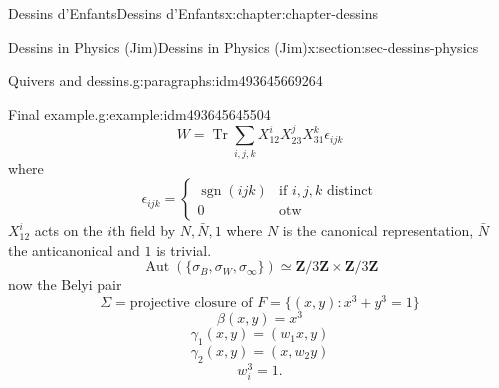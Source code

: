 \documentclass[oneside,10pt,]{book}
\numberwithin{equation}{section}
\newcommand{\ZZ}{\mathbf{Z}}
\DeclareMathOperator{\sgn}{sgn}
\DeclareMathOperator{\trace}{Tr}
\DeclareMathOperator{\Aut}{Aut}
\newcommand{\amp}{&}
\begin{document}
\begin{chapterptx}{Dessins d'Enfants}{}{Dessins d'Enfants}{}{}{x:chapter:chapter-dessins}
\begin{sectionptx}{Dessins in Physics (Jim)}{}{Dessins in Physics (Jim)}{}{}{x:section:sec-dessins-physics}
\begin{paragraphs}{Quivers and dessins.}{g:paragraphs:idm493645669264}
\begin{example}{Final example.}{g:example:idm493645645504}
\begin{equation*}
W = \trace \sum_{i,j,k} X_{12}^iX_{23}^j X_{31}^k \epsilon_{ijk}
\end{equation*}
where%
\begin{equation*}
\epsilon_{ijk} = \begin{cases} \sgn(ijk) \amp\text{if }i,j,k \text{ distinct}\\ 0 \amp\text{otw}\end{cases}
\end{equation*}
\(X_{12}^i\) acts on the \(i\)th field by \(N, \bar N, 1\) where \(N\) is the canonical representation, \(\bar N\) the anticanonical and \(1\) is trivial.%
\begin{equation*}
\Aut(\{\sigma_B,\sigma_W, \sigma_\infty\})  \simeq \ZZ/3\ZZ\times \ZZ/3\ZZ
\end{equation*}
now the Belyi pair%
\begin{equation*}
\Sigma = \text{projective closure of } F = \{(x,y) : x^3+ y^3 =1\}
\end{equation*}
%
\begin{equation*}
\beta(x,y) = x^3
\end{equation*}
%
\begin{equation*}
\gamma_1(x,y) = (w_1 x, y)
\end{equation*}
%
\begin{equation*}
\gamma_2(x,y) = (x,w_2  y)
\end{equation*}
%
\begin{equation*}
w_i^3 = 1\text{.}
\end{equation*}
%
\end{example}
\end{paragraphs}%
\end{sectionptx}
\end{chapterptx}
%
%
\typeout{************************************************}
\typeout{************************************************}
%
\end{document}
